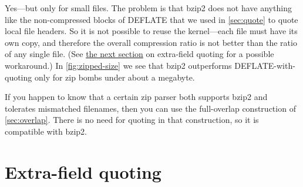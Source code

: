 \documentclass[letterpaper,twocolumn,10pt]{article}
\begin{document}
Yes---but only for small files.
The problem is that bzip2 does not have anything like the
non-compressed blocks of DEFLATE
that we used in \autoref{sec:quote} to quote local file headers.
So it is not possible to reuse the kernel---each file must have
its own copy, and therefore the overall compression ratio
is not better than the ratio of any single file.
(See \hyperref[sec:extra]{the next section}
on extra-field quoting for a possible workaround.)
In \autoref{fig:zipped-size} we see that
bzip2 outperforms DEFLATE-with-quoting
only for zip bombs under about a megabyte.

If you happen to know that a certain zip parser both supports bzip2
and tolerates mismatched filenames,
then you can use the full-overlap construction of \autoref{sec:overlap}.
There is no need for quoting in that construction,
so it is compatible with bzip2.


\section{Extra-field quoting}
\label{sec:extra}
\end{document}
